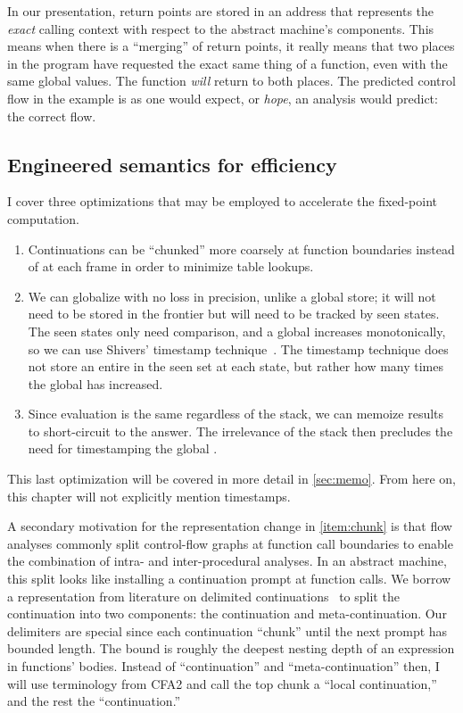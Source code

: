 In our presentation, return points are stored in an address that represents the \emph{exact} calling context with respect to the abstract machine's components.
This means when there is a ``merging'' of return points, it really means that two places in the program have requested the exact same thing of a function, even with the same global values.
The function \emph{will} return to both places.
The predicted control flow in the example is as one would expect, or \emph{hope}, an analysis would predict: the correct flow.

\subsection{Engineered semantics for efficiency}\label{sec:eng-frontier}
I cover three optimizations that may be employed to accelerate the fixed-point computation.
\begin{enumerate}
\item{\label{item:chunk}Continuations can be ``chunked'' more coarsely at function boundaries instead of at each frame in order to minimize table lookups.}
\item{We can globalize  with no loss in precision, unlike a global store;
      it will not need to be stored in the frontier but will need to be tracked by seen states.
The seen states only need comparison, and a global  increases monotonically, so we can use Shivers' timestamp technique~\citep{ianjohnson:Shivers:1991:CFA}.
The timestamp technique does not store an entire  in the seen set at each state, but rather how many times the global  has increased.}
\item{Since evaluation is the same regardless of the stack, we can memoize results to short-circuit to the answer.
      The irrelevance of the stack then precludes the need for timestamping the global .}
\end{enumerate}
This last optimization will be covered in more detail in \autoref{sec:memo}.
From here on, this chapter will not explicitly mention timestamps.

A secondary motivation for the representation change in \ref{item:chunk} is that flow analyses commonly split control-flow graphs at function call boundaries to enable the combination of intra- and inter-procedural analyses.
In an abstract machine, this split looks like installing a continuation prompt at function calls.
We borrow a representation from literature on delimited continuations~\citep{ianjohnson:Biernacki2006274} to split the continuation into two components: the continuation and meta-continuation.
Our delimiters are special since each continuation ``chunk'' until the next prompt has bounded length.
The bound is roughly the deepest nesting depth of an expression in functions' bodies.
Instead of ``continuation'' and ``meta-continuation'' then, I will use terminology from CFA2 and call the top chunk a ``local continuation,'' and the rest the ``continuation.''


